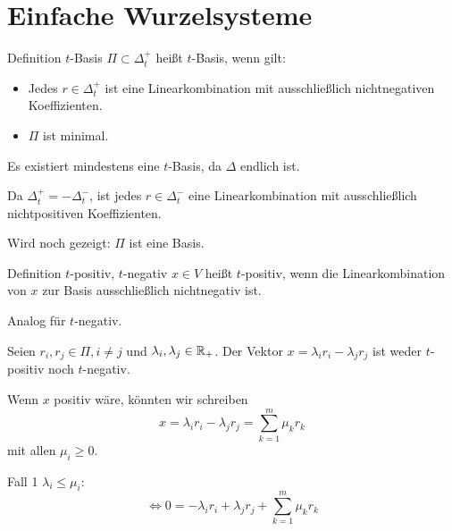 \documentclass[18pt,handout]{beamer}
\begin{document}
\section{Einfache Wurzelsysteme}
\begin{frame}{Definition \( t \)-Basis}
    \( \Pi \subset \Delta_t^+ \) heißt \( t \)-Basis, 
    wenn gilt:
    \begin{itemize}
        \item Jedes \( r \in \Delta_t^+ \) ist 
        eine Linearkombination mit ausschließlich 
        nichtnegativen Koeffizienten.
        \item \( \Pi \) ist minimal.
    \end{itemize} \pause
    Es existiert mindestens eine \( t \)-Basis, 
    da \( \Delta \) endlich ist. \pause
    
    Da \( \Delta_t^+ = - \Delta_t^- \), ist jedes 
    \( r \in \Delta_t^- \) eine Linearkombination 
    mit ausschließlich nichtpositiven Koeffizienten.

    \pause
    Wird noch gezeigt: \( \Pi \) ist eine Basis.
\end{frame}

\begin{frame}{Definition \(t\)-positiv, \( t \)-negativ}
    \( x \in V \) heißt \(t\)-positiv, wenn 
    die Linearkombination von \(x\) zur 
    Basis ausschließlich nichtnegativ ist.

    Analog für \( t \)-negativ.
\end{frame}

\begin{frame}
    \begin{satz} %
        Seien \( r_i, r_j \in \Pi, i \neq j \) und 
        \( \lambda_i, \lambda_j \in \mathbb{R}_+ \). 
        Der Vektor \( x = \lambda_i r_i - \lambda_j r_j \) 
        ist weder \( t \)-positiv noch \( t \)-negativ.
    \end{satz}
\end{frame}

\begin{frame}
    \begin{bew}
        Wenn \(x\) positiv wäre, könnten 
        wir schreiben 
        \[ x = \lambda_i r_i - \lambda_j r_j 
        = \sum_{k=1}^m \mu_k r_k \]
        mit allen \( \mu_i \geq 0 \). \pause

        Fall 1 \( \lambda_i \leq \mu_i \):
        \[ \Leftrightarrow 0 
        = - \lambda_i r_i + \lambda_j r_j 
        + \sum_{k=1}^m \mu_k r_k \]
        
        \renewcommand{\qedsymbol}{}
    \end{bew}
\end{frame}
\end{document}
